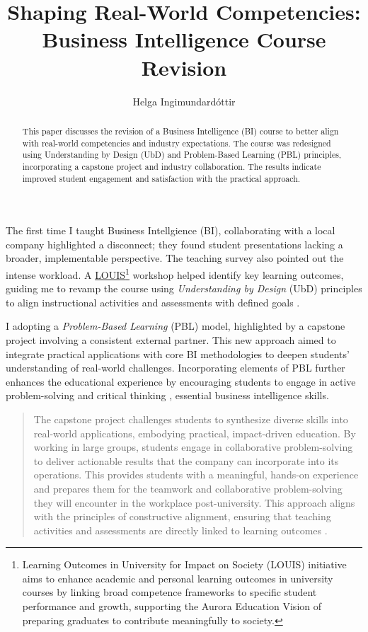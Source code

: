 \documentclass{article}
\title{Shaping Real-World Competencies: Business Intelligence Course Revision}
\author{Helga Ingimundardóttir}
\begin{document}
\maketitle

\begin{abstract}
\noindent
This paper discusses the revision of a Business Intelligence (BI) course to better align with real-world competencies and industry expectations. The course was redesigned using Understanding by Design (UbD) and Problem-Based Learning (PBL) principles, incorporating a capstone project and industry collaboration. The results indicate improved student engagement and satisfaction with the practical approach. %
\end{abstract}
\noindent 
The first time I taught Business Intellgience (BI), collaborating with a local company highlighted a disconnect; they found student presentations lacking a broader, implementable perspective. The teaching survey also pointed out the intense workload. A \href{https://aurora-universities.eu/louis/}{LOUIS}\footnote{Learning Outcomes in University for Impact on Society (LOUIS) initiative aims to enhance academic and personal learning outcomes in university courses by linking broad competence frameworks to specific student performance and growth, supporting the Aurora Education Vision of preparing graduates to contribute meaningfully to society.}  workshop helped identify key learning outcomes, guiding me to revamp the course using \textit{Understanding by Design} (UbD) principles to align instructional activities and assessments with defined goals \cite{wiggins2005understanding}.

I adopting a \textit{Problem-Based Learning} (PBL) model, highlighted by a capstone project involving a consistent external partner. This new approach aimed to integrate practical applications with core BI methodologies to deepen students' understanding of real-world challenges. Incorporating elements of PBL further enhances the educational experience by encouraging students to engage in active problem-solving and critical thinking \cite{barrows1980problem}, essential business intelligence skills.

\begin{quote}
The capstone project challenges students to synthesize diverse skills into real-world applications, embodying practical, impact-driven education. By working in large groups, students engage in collaborative problem-solving to deliver actionable results that the company can incorporate into its operations. This provides students with a meaningful, hands-on experience and prepares them for the teamwork and collaborative problem-solving they will encounter in the workplace post-university. This approach aligns with the principles of constructive alignment, ensuring that teaching activities and assessments are directly linked to learning outcomes \cite{biggs_constructive}. 
\end{quote}
\end{document}
